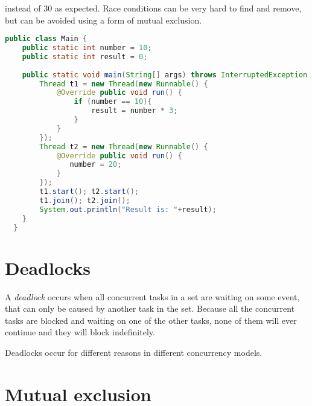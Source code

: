instead of 30 as expected. Race conditions can be very hard to find and remove, but can be avoided using a form of mutual exclusion.
\begin{lstlisting}[float,label=lst:racecondition,
  caption={Race condition example},
  language=Java,  
  showspaces=false,
  showtabs=false,
  breaklines=true,
  showstringspaces=false,
  breakatwhitespace=true,
  commentstyle=\color{greencomments},
  keywordstyle=\color{bluekeywords},
  stringstyle=\color{redstrings}]  % Start your code-block
public class Main {
    public static int number = 10;
    public static int result = 0;
    
    public static void main(String[] args) throws InterruptedException {
        Thread t1 = new Thread(new Runnable() {
            @Override public void run() {
                if (number == 10){
                    result = number * 3;
                }
            }
        });
        Thread t2 = new Thread(new Runnable() {
            @Override public void run() {
               number = 20;
            }
        });
        t1.start(); t2.start();
        t1.join(); t2.join();
        System.out.println("Result is: "+result);
    }
  }
\end{lstlisting}

 
\section{Deadlocks}
A \emph{deadlock} occurs when all concurrent tasks in a set are waiting on some event, that can only be caused by another task in the set\cite[p. 435]{tanenbaum2008modern}. Because all the concurrent tasks are blocked and waiting on one of the other tasks, none of them will ever continue and they will block indefinitely.


Deadlocks occur for different reasons in different concurrency models.

\section{Mutual exclusion}
 
\worksheetend

